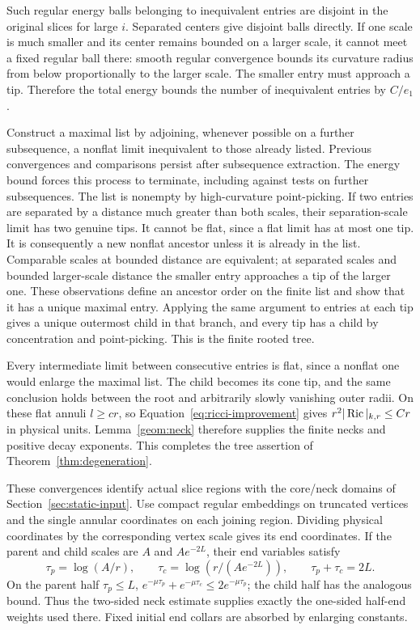 Such regular energy balls belonging to inequivalent entries are
disjoint in the original slices for large $i$. Separated centers
give disjoint balls directly. If one scale is much smaller and
its center remains bounded on a larger scale, it cannot meet a
fixed regular ball there: smooth regular convergence bounds its
curvature radius from below proportionally to the larger scale.
The smaller entry must approach a tip. Therefore the total energy
bounds the number of inequivalent entries by $C/e_1$.

Construct a maximal list by adjoining, whenever possible on a
further subsequence, a nonflat limit inequivalent to those already
listed. Previous convergences and comparisons persist after
subsequence extraction. The energy bound forces this process to
terminate, including against tests on further subsequences.
The list is nonempty by high-curvature point-picking.
If two entries are separated by a distance much greater than both
scales, their separation-scale limit has two genuine tips. It cannot
be flat, since a flat limit has at most one tip. It is consequently a
new nonflat ancestor unless it is already in the list.
Comparable scales at bounded distance are equivalent; at separated
scales and bounded larger-scale distance the smaller entry approaches
a tip of the larger one. These observations define an ancestor order
on the finite list and show that it has a unique maximal entry.
Applying the same argument to entries at each tip gives a unique
outermost child in that branch, and every tip has a child by
concentration and point-picking. This is the finite rooted tree.

Every intermediate limit between consecutive entries is flat,
since a nonflat one would enlarge the maximal list. The child becomes
its cone tip, and the same conclusion holds between the root and
arbitrarily slowly vanishing outer radii. On these flat annuli
$l\geq cr$, so Equation~\eqref{eq:ricci-improvement} gives
$r^2|\operatorname{Ric}|_{k,r}\leq Cr$ in physical units. Lemma~\ref{geom:neck}
therefore supplies the finite necks and positive decay exponents.
This completes the tree assertion of Theorem~\ref{thm:degeneration}.

These convergences identify actual slice regions with the core/neck
domains of Section~\ref{sec:static-input}. Use compact regular embeddings
on truncated vertices and the single annular coordinates on each
joining region. Dividing physical coordinates by the corresponding
vertex scale gives its end coordinates. If the parent and child
scales are $A$ and $Ae^{-2L}$, their end variables satisfy
\[
 \tau_p=\log(A/r),\qquad
 \tau_c=\log(r/(Ae^{-2L})),\qquad \tau_p+\tau_c=2L.
\]
On the parent half $\tau_p\leq L$,
$e^{-\mu\tau_p}+e^{-\mu\tau_c}\leq2e^{-\mu\tau_p}$;
the child half has the analogous bound. Thus the two-sided neck
estimate supplies exactly the one-sided half-end weights used there.
Fixed initial end collars are absorbed by enlarging constants.

